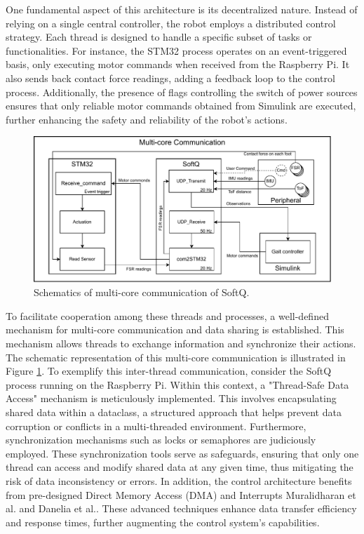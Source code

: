 One fundamental aspect of this architecture is its decentralized nature. Instead of relying on a single central controller, the robot employs a distributed control strategy. Each thread is designed to handle a specific subset of tasks or functionalities. For instance, the STM32 process operates on an event-triggered basis, only executing motor commands when received from the Raspberry Pi. It also sends back contact force readings, adding a feedback loop to the control process. Additionally, the presence of flags controlling the switch of power sources ensures that only reliable motor commands obtained from Simulink are executed, further enhancing the safety and reliability of the robot's actions. 
\begin{figure}[htb]
    \centering
    \includegraphics[width=0.9\linewidth]{img/chap4/process.pdf}
    \caption{Schematics of multi-core communication of SoftQ.}
    \label{fig:process}
\end{figure}

To facilitate cooperation among these threads and processes, a well-defined mechanism for multi-core communication and data sharing is established. This mechanism allows threads to exchange information and synchronize their actions. The schematic representation of this multi-core communication is illustrated in Figure \ref{fig:process}. To exemplify this inter-thread communication, consider the SoftQ process running on the Raspberry Pi. Within this context, a "Thread-Safe Data Access" mechanism is meticulously implemented. This involves encapsulating shared data within a dataclass, a structured approach that helps prevent data corruption or conflicts in a multi-threaded environment. Furthermore, synchronization mechanisms such as locks or semaphores are judiciously employed. These synchronization tools serve as safeguards, ensuring that only one thread can access and modify shared data at any given time, thus mitigating the risk of data inconsistency or errors. In addition, the control architecture benefits from pre-designed Direct Memory Access (DMA) and Interrupts Muralidharan et al.\cite{thorapallimuralidharanContinuumActuatorBased2020} and Danelia et al.\cite{daneliaStructureGaitOptimizationof2021}. These advanced techniques enhance data transfer efficiency and response times, further augmenting the control system's capabilities.

